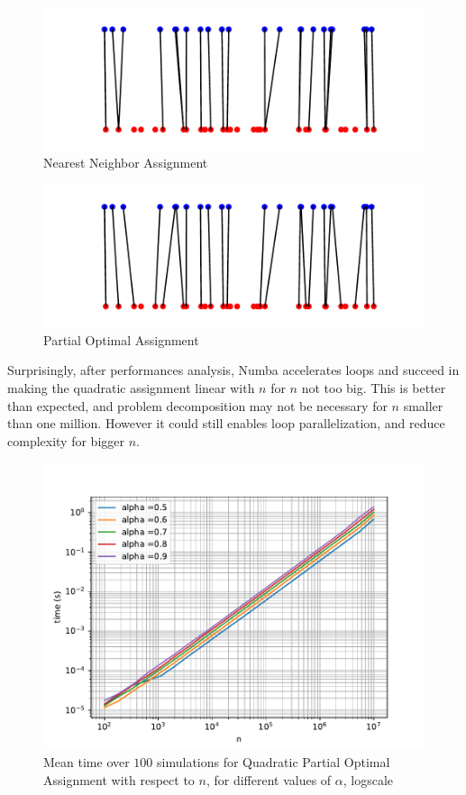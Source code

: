 \documentclass[a4paper,12pt]{article}
\begin{document}
\begin{figure}[H]
\includegraphics[width = \columnwidth]{t_fig.pdf}
\caption{Nearest Neighbor Assignment}\label{t_fig}
\end{figure}

\begin{figure}[H]
\includegraphics[width = \columnwidth]{a_fig.pdf}
\caption{Partial Optimal Assignment}\label{a_fig}
\end{figure}

Surprisingly, after performances analysis, Numba accelerates loops and succeed in making the quadratic assignment linear with $n$ for $n$ not too big. This is better than expected, and problem decomposition may not be necessary for $n$ smaller than one million. However it could still enables loop parallelization, and reduce complexity for bigger $n$.

\begin{figure}[H]
\includegraphics[width = \columnwidth]{a_time.pdf}
\caption{Mean time over $100$ simulations for Quadratic Partial Optimal Assignment with respect to $n$, for different values of $\alpha$, logscale}\label{a_time}
\end{figure}
\end{document}
